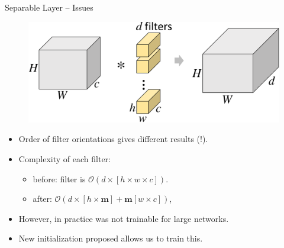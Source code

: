 \documentclass[t,xcolor=dvipsnames]{beamer}
\begin{document}
\begin{frame}{Separable Layer -- Issues}
\begin{figure}
\includegraphics[width=\textwidth, page=2]{../Figs/PDF/sparsification}
\end{figure}
\begin{itemize}
    \item Order of filter orientations gives different results (!).
    \item Complexity of each filter:
    \begin{itemize}
        \item before: filter is $\mathcal{O}(d \times [h\times w \times c])$.
        \item after: $\mathcal{O}(d\times [h\times \mathbf{m}] + \mathbf{m} [w \times c])$,
    \end{itemize}
    \item However, in practice was not trainable for large networks.
    \item New initialization proposed allows us to train this.
\end{itemize}
\end{frame}
\end{document}
